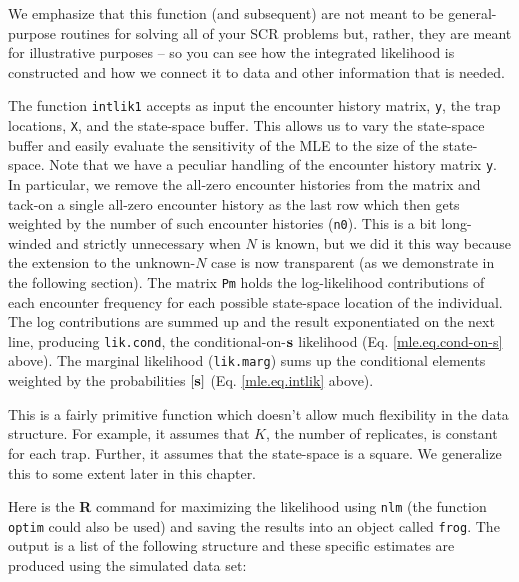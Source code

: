 We emphasize that this function (and subsequent) are not meant to be
general-purpose routines for solving all of your SCR problems but,
rather, they are meant for illustrative purposes -- so you can see how
the integrated likelihood is constructed and how we connect it to data
and other information that is needed.

The function \mbox{\tt intlik1} accepts as input the encounter history
matrix, \mbox{\tt y}, the
trap locations, \mbox{\tt X}, and the state-space buffer. This allows us to
vary the state-space buffer and easily evaluate the sensitivity of the
MLE to the size of the state-space.  Note that we have a peculiar
handling of the encounter history matrix \mbox{\tt y}. In particular, we remove
the all-zero encounter histories from the matrix and tack-on a single
all-zero encounter history as the last row which then gets weighted by
the number of such encounter histories (\mbox{\tt n0}). This is a bit
long-winded and strictly unnecessary when $N$ is known, but we did it
this way because the extension to the unknown-$N$ case is now
transparent (as we demonstrate in the following section).  The matrix
\mbox{\tt Pm} holds the log-likelihood contributions of each encounter
frequency for each possible state-space location of the individual.
The log contributions are summed up and the result exponentiated on
the next line, producing \mbox{\tt lik.cond}, the conditional-on-${\bf s}$
likelihood (Eq. \ref{mle.eq.cond-on-s} above). The marginal likelihood
(\mbox{\tt lik.marg}) sums up the conditional elements weighted by the probabilities
$[{\bf s}]$ (Eq. \ref{mle.eq.intlik} above).  

This is a fairly
primitive function which doesn't allow much flexibility in the data
structure. For example, it assumes that $K$, the number of replicates,
is constant for each trap. Further, it assumes that the state-space is
a square. We generalize this to some extent later in this chapter.

Here is the {\bf R} command for maximizing the likelihood using
\mbox{\tt nlm} (the function \mbox{\tt optim} could also be used) and saving the
results into an object called \mbox{\tt frog}.  The output is a list of the
following structure and these specific estimates are produced using
the simulated data set:

